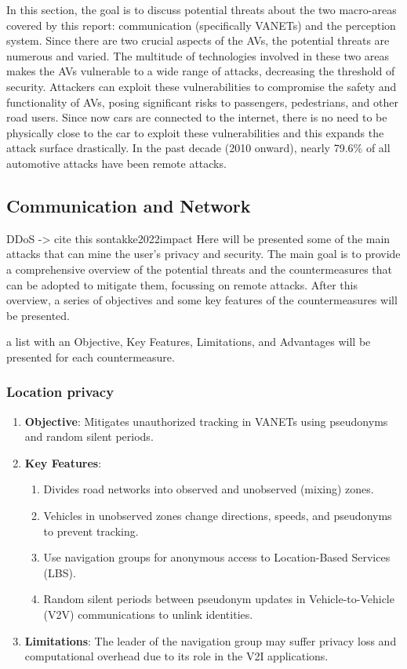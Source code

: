 In this section, the goal is to discuss potential threats about the two macro-areas covered by this report:
communication (specifically VANETs) and the perception system.
Since there are two crucial aspects of the AVs, the potential threats are numerous and varied.
The multitude of technologies involved in these two areas makes the AVs vulnerable to a wide range of attacks,
decreasing the threshold of security.
Attackers can exploit these vulnerabilities to compromise the safety and functionality of AVs, posing significant risks to passengers, pedestrians, and other road users.
Since now cars are connected to the internet, there is no need to be physically close to the car to exploit these vulnerabilities and this expands the attack surface drastically.
In the past decade (2010 onward), nearly 79.6\% of all automotive attacks have been
remote attacks\cite{cybersec}.

\subsection{Communication and Network}\label{subsec:v2x-communication-and-network}
DDoS -> cite this sontakke2022impact
Here will be presented some of the main attacks that can mine the user's privacy and security.
The main goal is to provide a comprehensive overview of the potential threats and the
countermeasures that can be adopted to mitigate them, focussing on remote attacks.
After this overview, a series of objectives and some key features of the countermeasures will be presented.

a list with an Objective, Key Features,
Limitations, and Advantages will be presented for each countermeasure.

\subsubsection{Location privacy}
\begin{enumerate}
    \item \textbf{Objective}: Mitigates unauthorized tracking in VANETs using pseudonyms and random silent periods.
    \item \textbf{Key Features}:
    \begin{enumerate}
        \item Divides road networks into observed and unobserved (mixing) zones.
        \item Vehicles in unobserved zones change directions, speeds, and pseudonyms to prevent tracking.
        \item Use navigation groups for anonymous access to Location-Based Services (LBS).
        \item Random silent periods between pseudonym updates in Vehicle-to-Vehicle (V2V) communications to unlink identities.
    \end{enumerate}
    \item \textbf{Limitations}: The leader of the navigation group may suffer privacy loss and computational overhead due to its role in the V2I applications.
\end{enumerate}

